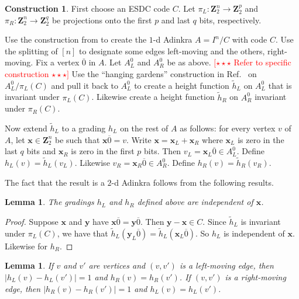 \documentclass[12pt,twoside,singlespace]{article}
\numberwithin{equation}{section}
\newtheorem{lem}[equation]{Lemma}
\theoremstyle{definition}
\newtheorem{construction}[equation]{Construction}
\newcommand{\ZZ}{\mathbf{Z}}
\newcommand{\com}[1]{\textcolor{red}{$[\star \star \star$ #1 $\star \star \star]$}}
\renewcommand{\vec}[1]{\mathbf{#1}}
\begin{document}
\begin{construction}
First choose an ESDC code $C$.  Let $\pi_L:\ZZ_2^n\to\ZZ_2^p$ and $\pi_R:\ZZ_2^n\to\ZZ_2^q$ be projections onto the first $p$ and last $q$ bits, respectively.

Use the construction from \cite{d2l:omni,d2l:topology} to create the $1$-d Adinkra $A=I^n/C$ with code $C$.  Use the splitting of $[n]$ to designate some edges left-moving and the others, right-moving.  Fix a vertex $\overline{0}$ in $A$.  Let $A_L^0$ and $A_R^0$ be as above. \com{Refer to specific construction}  Use the ``hanging gardens'' construction in Ref.~\cite{d2l:graph-theoretic} on $A_L^0/\pi_L(C)$ and pull it back to $A_L^0$ to create a height function $\tilde{h}_L$ on $A_L^0$ that is invariant under $\pi_L(C)$.  Likewise create a height function $\tilde{h}_R$ on $A_R^0$ invariant under $\pi_R(C)$.

Now extend $\tilde{h}_L$ to a grading $h_L$ on the rest of $A$ as follows: for every vertex $v$ of $A$, let $\vec{x}\in \ZZ_2^n$ be such that $\vec{x}\overline{0}=v$.  Write $\vec{x}=\vec{x}_L+\vec{x}_R$ where $\vec{x}_L$ is zero in the last $q$ bits and $\vec{x}_R$ is zero in the first $p$ bits.  Then $v_L=\vec{x}_L\overline{0}\in A_L^0$.  Define $h_L(v)=\tilde{h}_L(v_L)$.  Likewise $v_R=\vec{x}_R\overline{0}\in A_R^0$.  Define $h_R(v)=\tilde{h}_R(v_R)$.
\end{construction}

The fact that the result is a $2$-d Adinkra follows from the following results.

\begin{lem}
The gradings $h_L$ and $h_R$ defined above are independent of $\vec{x}$.\label{lem:indep}
\end{lem}

\begin{proof}
Suppose $\vec{x}$ and $\vec{y}$ have $\vec{x}\overline{0}=\vec{y}\overline{0}$.  Then $\vec{y}-\vec{x}\in C$.  Since $\tilde{h}_L$ is invariant under $\pi_L(C)$, we have that $\tilde{h}_L(\vec{y}_L\overline{0})=\tilde{h}_L(\vec{x}_L\overline{0})$.  So $h_L$ is independent of $\vec{x}$.  Likewise for $h_R$.
\end{proof}

\begin{lem}
If $v$ and $v'$ are vertices and $(v,v')$ is a left-moving edge, then
$|h_L(v)-h_L(v')|=1$ and $h_R(v)=h_R(v')$.  If $(v,v')$ is a right-moving edge, then $|h_R(v)-h_R(v')|=1$ and $h_L(v)=h_L(v')$.
\end{lem}
\end{document}
